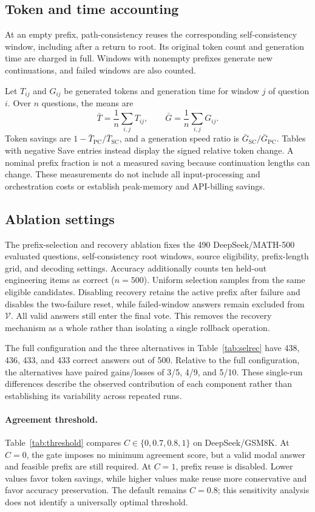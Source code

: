 \subsection{Token and time accounting}
\label{app:accounting}
At an empty prefix, path-consistency reuses the corresponding self-consistency window, including after a return to root. Its original token count and generation time are charged in full. Windows with nonempty prefixes generate new continuations, and failed windows are also counted.

Let $T_{ij}$ and $G_{ij}$ be generated tokens and generation time for window $j$ of question $i$. Over $n$ questions, the means are
\[
 \bar T=\frac{1}{n}\sum_{i,j}T_{ij},\qquad
 \bar G=\frac{1}{n}\sum_{i,j}G_{ij}.
\]
Token savings are $1-\bar T_{\mathrm{PC}}/\bar T_{\mathrm{SC}}$, and a generation speed ratio is $\bar G_{\mathrm{SC}}/\bar G_{\mathrm{PC}}$. Tables with negative Save entries instead display the signed relative token change. A nominal prefix fraction is not a measured saving because continuation lengths can change. These measurements do not include all input-processing and orchestration costs or establish peak-memory and API-billing savings.

\subsection{Ablation settings}
\label{app:ablation_design}
The prefix-selection and recovery ablation fixes the 490 DeepSeek/MATH-500 evaluated questions, self-consistency root windows, source eligibility, prefix-length grid, and decoding settings. Accuracy additionally counts ten held-out engineering items as correct ($n=500$). Uniform selection samples from the same eligible candidates. Disabling recovery retains the active prefix after failure and disables the two-failure reset, while failed-window answers remain excluded from $\mathcal V$. All valid answers still enter the final vote. This removes the recovery mechanism as a whole rather than isolating a single rollback operation.

The full configuration and the three alternatives in Table~\ref{tab:selrec} have 438, 436, 433, and 433 correct answers out of 500. Relative to the full configuration, the alternatives have paired gains/losses of 3/5, 4/9, and 5/10. These single-run differences describe the observed contribution of each component rather than establishing its variability across repeated runs.

\paragraph{Agreement threshold.}
\label{app:threshold}
Table~\ref{tab:threshold} compares $C\in\{0,0.7,0.8,1\}$ on DeepSeek/GSM8K. At $C=0$, the gate imposes no minimum agreement score, but a valid modal answer and feasible prefix are still required. At $C=1$, prefix reuse is disabled. Lower values favor token savings, while higher values make reuse more conservative and favor accuracy preservation. The default remains $C=0.8$; this sensitivity analysis does not identify a universally optimal threshold.

